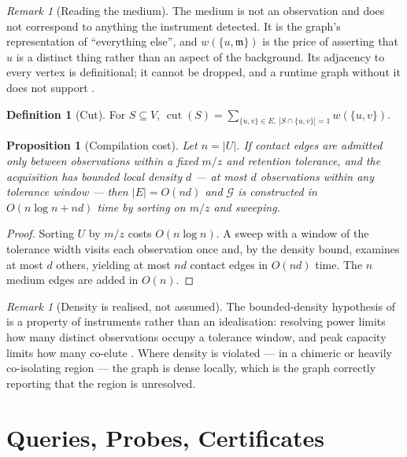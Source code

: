 \documentclass[11pt,a4paper]{article}
\newtheorem{proposition}[theorem]{Proposition}
\theoremstyle{definition}
\newtheorem{definition}[theorem]{Definition}
\theoremstyle{remark}
\newtheorem{remark}[theorem]{Remark}
\newcommand{\Gph}{\mathcal{G}}
\newcommand{\wt}{w}
\newcommand{\med}{\mathfrak{m}}
\newcommand{\cut}{\operatorname{cut}}
\begin{document}
\begin{remark}[Reading the medium]\label{rem:medium}
The medium is not an observation and does not correspond to anything the
instrument detected. It is the graph's representation of ``everything
else'', and $\wt(\{u,\med\})$ is the price of asserting that $u$ is a
distinct thing rather than an aspect of the background. Its adjacency to
every vertex is definitional; it cannot be dropped, and a runtime graph
without it does not support .
\end{remark}

\begin{definition}[Cut]\label{def:cut}
For $S \subseteq V$,
$\cut(S) = \sum_{\{u,v\} \in E,\ |S \cap \{u,v\}| = 1} \wt(\{u,v\})$.
\end{definition}

\begin{proposition}[Compilation cost]\label{prop:compile}
Let $n = |U|$. If contact edges are admitted only between observations
within a fixed $m/z$ and retention tolerance, and the acquisition has
bounded local density $d$ --- at most $d$ observations within any
tolerance window --- then $|E| = O(nd)$ and $\Gph$ is constructed in
$O(n \log n + nd)$ time by sorting on $m/z$ and sweeping.
\end{proposition}

\begin{proof}
Sorting $U$ by $m/z$ costs $O(n\log n)$. A sweep with a window of the
tolerance width visits each observation once and, by the density bound,
examines at most $d$ others, yielding at most $nd$ contact edges in
$O(nd)$ time. The $n$ medium edges are added in $O(n)$.
\end{proof}

\begin{remark}[Density is realised, not assumed]\label{rem:density}
The bounded-density hypothesis of  is a property of
instruments rather than an idealisation: resolving power limits how many
distinct observations occupy a tolerance window, and peak capacity limits
how many co-elute \citep{michalski2011more}. Where density is violated
--- in a chimeric or heavily co-isolating region --- the graph is dense
locally, which is the graph correctly reporting that the region is
unresolved.
\end{remark}

\section{Queries, Probes, Certificates}
\label{sec:probe}
\end{document}

